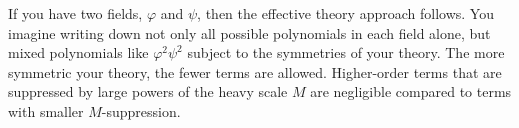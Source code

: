 \begin{example}
If you have two fields, $\varphi$ and $\psi$, then the effective theory approach follows. You imagine writing down not only all possible polynomials in each field alone, but mixed polynomials like $\varphi^2\psi^2$ subject to the symmetries of your theory. The more symmetric your theory, the fewer terms are allowed. Higher-order terms that are suppressed by large powers of the heavy scale $M$ are negligible compared to terms with smaller $M$-suppression.
\end{example}














